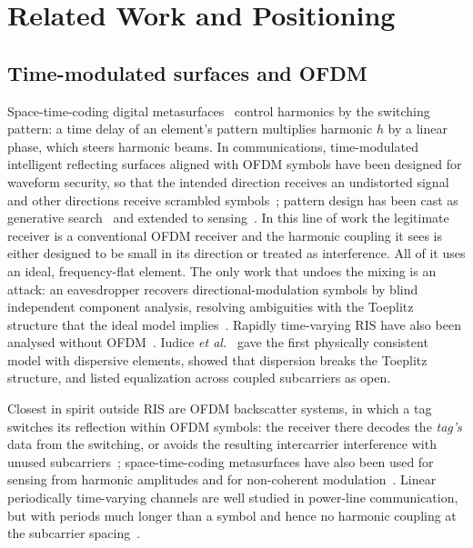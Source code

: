 \section{Related Work and Positioning}\label{sec:related}

\subsection{Time-modulated surfaces and OFDM}
Space-time-coding digital metasurfaces~\cite{zhang2018} control harmonics by the
switching pattern: a time delay of an element's pattern multiplies harmonic $h$ by a
linear phase, which steers harmonic beams. In communications, time-modulated
intelligent reflecting surfaces aligned with OFDM symbols have been designed for
waveform security, so that the intended direction receives an undistorted signal and
other directions receive scrambled symbols~\cite{xu2023tmirs}; pattern design has been
cast as generative search~\cite{tao2025gflownet,wang2026generative} and extended to
sensing~\cite{tao2025isac}. In this line of work the legitimate receiver is a
conventional OFDM receiver and the harmonic coupling it sees is either designed to be
small in its direction or treated as interference. All of it uses an ideal,
frequency-flat element. The only work that undoes the mixing is an attack: an
eavesdropper recovers directional-modulation symbols by blind independent component
analysis, resolving ambiguities with the Toeplitz structure that the ideal model
implies~\cite{tao2025secure}. Rapidly time-varying RIS have also been analysed without
OFDM~\cite{verde2023}. Iudice \emph{et al.}~\cite{iudice2026} gave the first physically
consistent model with dispersive elements, showed that dispersion breaks the Toeplitz
structure, and listed equalization across coupled subcarriers as open.

Closest in spirit outside RIS are OFDM backscatter systems, in which a tag switches its reflection within OFDM
symbols: the receiver there decodes the \emph{tag's} data from the switching, or avoids the resulting intercarrier
interference with unused subcarriers~\cite{liu2021tscatter,bsici2024,sr2024free}; space-time-coding metasurfaces
have also been used for sensing from harmonic amplitudes and for non-coherent modulation~\cite{stcisac2025,stcdiff2025}.
Linear periodically time-varying channels are well studied in power-line communication, but with periods much
longer than a symbol and hence no harmonic coupling at the subcarrier spacing~\cite{plc_lptv}.

